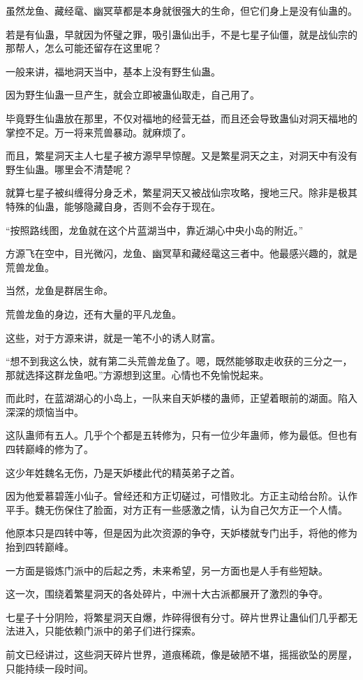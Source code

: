 \begin{this_body}
虽然龙鱼、藏经鼋、幽冥草都是本身就很强大的生命，但它们身上是没有仙蛊的。

若是有仙蛊，早就因为怀璧之罪，吸引蛊仙出手，不是七星子仙僵，就是战仙宗的那帮人，怎么可能还留存在这里呢？

一般来讲，福地洞天当中，基本上没有野生仙蛊。

因为野生仙蛊一旦产生，就会立即被蛊仙取走，自己用了。

毕竟野生仙蛊放在那里，不仅对福地的经营无益，而且还会导致蛊仙对洞天福地的掌控不足。万一将来荒兽暴动。就麻烦了。

而且，繁星洞天主人七星子被方源早早惊醒。又是繁星洞天之主，对洞天中有没有野生仙蛊。哪里会不清楚呢？

就算七星子被纠缠得分身乏术，繁星洞天又被战仙宗攻略，搜地三尺。除非是极其特殊的仙蛊，能够隐藏自身，否则不会存于现在。

“按照路线图，龙鱼就在这个片蓝湖当中，靠近湖心中央小岛的附近。”

方源飞在空中，目光微闪，龙鱼、幽冥草和藏经鼋这三者中。他最感兴趣的，就是荒兽龙鱼。

当然，龙鱼是群居生命。

荒兽龙鱼的身边，还有大量的平凡龙鱼。

这些，对于方源来讲，就是一笔不小的诱人财富。

“想不到我这么快，就有第二头荒兽龙鱼了。嗯，既然能够取走收获的三分之一，那就选择这群龙鱼吧。”方源想到这里。心情也不免愉悦起来。

而此时，在蓝湖湖心的小岛上，一队来自天妒楼的蛊师，正望着眼前的湖面。陷入深深的烦恼当中。

这队蛊师有五人。几乎个个都是五转修为，只有一位少年蛊师，修为最低。但也有四转巅峰的修为了。

这少年姓魏名无伤，乃是天妒楼此代的精英弟子之首。

因为他爱慕碧莲小仙子。曾经还和方正切磋过，可惜败北。方正主动给台阶。认作平手。魏无伤保住了脸面，对方正有一些感激之情，认为自己欠方正一个人情。

他原本只是四转中等，但是因为此次资源的争夺，天妒楼就专门出手，将他的修为抬到四转巅峰。

一方面是锻炼门派中的后起之秀，未来希望，另一方面也是人手有些短缺。

这一次，围绕着繁星洞天的各处碎片，中洲十大古派都展开了激烈的争夺。

七星子十分阴险，将繁星洞天自爆，炸碎得很有分寸。碎片世界让蛊仙们几乎都无法进入，只能依赖门派中的弟子们进行探索。

前文已经讲过，这些洞天碎片世界，道痕稀疏，像是破陋不堪，摇摇欲坠的房屋，只能持续一段时间。


\end{this_body}

